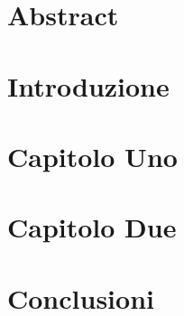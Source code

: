 \documentclass[a4paper,12pt,oneside]{book}
\begin{document}
    
	    
    \chapter*{Abstract}
    \blindtext


    \tableofcontents

    \chapter*{Introduzione}
    

    \chapter{Capitolo Uno}
    


    \chapter{Capitolo Due}
    


    \chapter*{Conclusioni}
    

    \printbibliography
    
\end{document}

